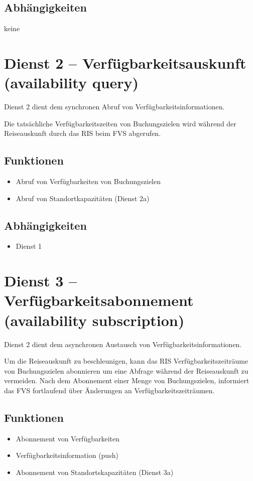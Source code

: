 \subsection*{Abhängigkeiten}
keine 

\section{Dienst 2 -- Verfügbarkeitsauskunft (availability query) }
Dienst 2 dient dem synchronen Abruf von Verfügbarkeitsinformationen.

Die tatsächliche Verfügbarkeitszeiten von Buchungszielen wird während der Reiseauskunft durch das RIS beim FVS abgerufen. 

\subsection*{Funktionen}
\begin{itemize}
\item Abruf von Verfügbarkeiten von Buchungszielen
\item Abruf von Standortkapazitäten (Dienst 2a)
\end{itemize}

\subsection*{Abhängigkeiten}
\begin{itemize}
\item Dienst 1
\end{itemize}

\section{Dienst 3 -- Verfügbarkeitsabonnement (availability subscription) }
Dienst 2 dient dem asynchronen Austausch von Verfügbarkeitsinformationen.

Um die Reiseauskunft zu beschleunigen, kann das RIS Verfügbarkeitszeiträume von Buchungszielen abonnieren um eine Abfrage während der Reiseauskunft zu vermeiden. Nach dem Abonnement einer Menge von Buchungszielen, informiert das FVS fortlaufend über Änderungen an Verfügbarkeitszeiträumen.

\subsection*{Funktionen}
\begin{itemize}
\item Abonnement von Verfügbarkeiten
\item Verfügbarkeitsinformation (push)
\item Abonnement von Standortskapazitäten (Dienst 3a)
\end{itemize}

